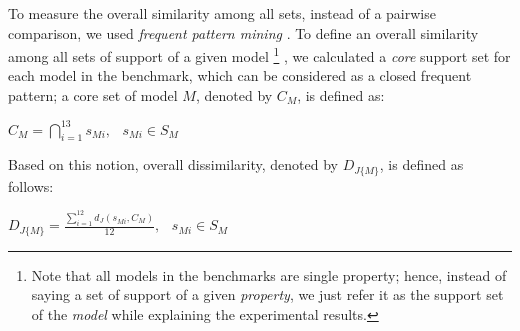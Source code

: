 %
%
%
%
%
%

To measure the overall similarity among all sets, instead of a pairwise comparison, we used \emph{frequent pattern mining} \cite{han2007frequent}. To define an overall similarity among all sets of support of a given model
\footnote{Note that all models in the benchmarks are single property; hence, instead of saying a set of support of a given \emph{property}, we just refer it as the support set of the \emph{model} while explaining the experimental results.}
, we calculated a \emph{core} support set for each model in the benchmark, which can be considered as a closed frequent pattern; a core set of model $M$, denoted by $C_M$, is defined as:
\begin{definition}
  \label{def:core}
  $C_M = \bigcap_{i=1}^{13} s_{Mi},   \hspace{9pt} s_{Mi} \in S_M$
\end{definition}

Based on this notion, overall dissimilarity, denoted by $D_{J\{M\}}$, is defined as follows:

\begin{definition}
  \label{def:dis}
  $D_{J\{M\}} =  \frac{\sum_{i=1}^{12}d_J(s_{Mi}, C_M)}{12},   \hspace{9pt} s_{Mi} \in S_M$
\end{definition}

